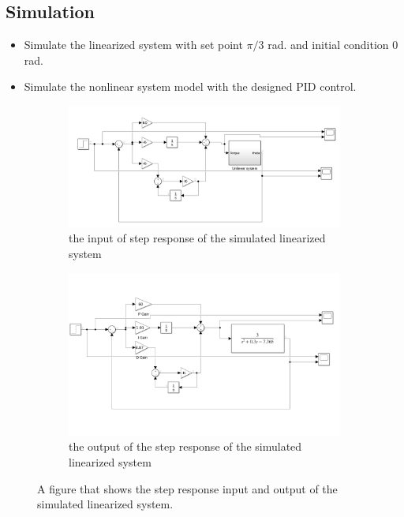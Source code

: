 \documentclass[12pt]{article}
\begin{document}
\subsection*{Simulation}

\begin{itemize}
  \item Simulate the linearized system with set point $\pi/3$ rad. and initial condition 0 rad.
  \item Simulate the nonlinear system model with the designed PID control.
\end{itemize}

\begin{figure}[H]
\centering
\begin{subfigure}{0.5\textwidth}
  \centering
  \includegraphics[width=1\linewidth]{images/unlin_simu.png}
  \caption{the input of step response of the simulated linearized system} \label{my_input_step_li}
\end{subfigure}%
\begin{subfigure}{0.5\textwidth}
  \centering
  \includegraphics[width=1\linewidth]{images/lin_simu.png}
  \caption{the output of the step response of the simulated linearized system} \label{my_output_step_li}
\end{subfigure}
\caption{A figure that shows the step response input and output of the simulated linearized system.}
\label{fig:step_li}
\end{figure}
\end{document}
